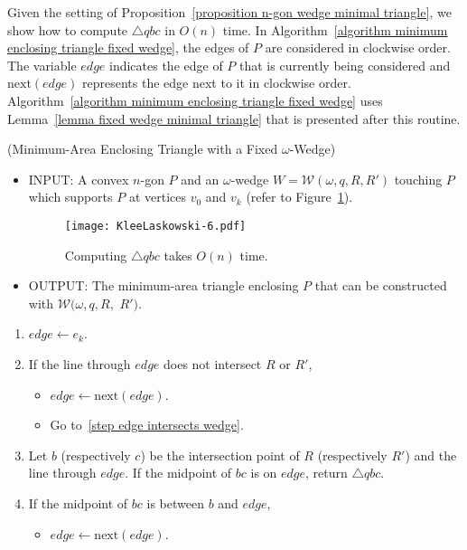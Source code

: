 \documentclass[11pt, oneside]{article}
\def\wedge{\mathcal{W}}
\begin{document}
Given the setting of Proposition~\ref{proposition n-gon wedge minimal triangle},
we show how to compute $\triangle qbc$ in $O(n)$ time.
In Algorithm~\ref{algorithm minimum enclosing triangle fixed wedge},
the edges of $P$ are considered in clockwise order.
The variable $edge$ indicates
the edge of $P$
that is currently being considered
and $\textrm{next}(edge)$ represents the edge next to it in clockwise order.
Algorithm~\ref{algorithm minimum enclosing triangle fixed wedge} uses
Lemma~\ref{lemma fixed wedge minimal triangle}
that is presented
after this routine.
\begin{algorithm}(Minimum-Area Enclosing Triangle with a Fixed $\omega$-Wedge)
\label{algorithm minimum enclosing triangle fixed wedge}
\begin{itemize}
\item INPUT: A convex $n$-gon $P$ 
and an $\omega$-wedge $W=\wedge(\omega,q,R,R')$ touching $P$
which supports $P$ at vertices $v_0$ and $v_k$
(refer to Figure~\ref{figure KleeLaskowski-6}).
\begin{figure}
\centering
\texttt{[image: KleeLaskowski-6.pdf]}
\caption{Computing $\triangle qbc$ takes $O(n)$ time.\label{figure KleeLaskowski-6}}
\end{figure}

\item OUTPUT: The minimum-area triangle enclosing $P$
that can be constructed with $\wedge(\omega,q,R,$ $R')$.
\end{itemize}
\begin{enumerate}
\item $edge \longleftarrow e_k$.

\item\label{step edge intersects wedge} 
If the line through $edge$ does not intersect $R$
or $R'$,
\begin{itemize}
\item $edge \longleftarrow \textrm{next}(edge)$.

\item Go to~\ref{step edge intersects wedge}.
\end{itemize}

\item\label{step midpoint on P}
Let $b$ (respectively $c$)
be the intersection point
of $R$ (respectively $R'$)
and the line through $edge$.
If the midpoint of $bc$
is on $edge$, 
return $\triangle qbc$.

\item If the midpoint of $bc$ is between $b$ and $edge$,
\begin{itemize}
\item $edge \longleftarrow \textrm{next}(edge)$.


\end{itemize}
\end{enumerate}
\end{algorithm}
\end{document}
